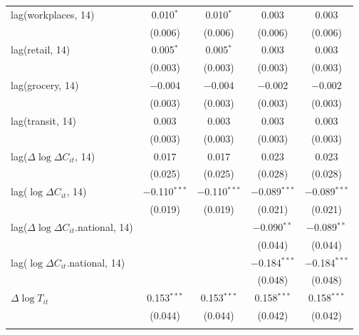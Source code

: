\documentclass{beamer}
\def\bcolor{\color{forestgreen(web)}}
\def\icolor{\color{magenta}}
\begin{document}
\begin{frame}
\begin{table}[!htbp]
\begin{minipage}{\linewidth}
{\begin{tabular}{@{\extracolsep{1pt}}lcccc}
  {\bcolor lag(workplaces, 14) }&{\bcolor  0.010$^{*}$ }& {\bcolor 0.010$^{*}$} &{\bcolor  0.003} & {\bcolor 0.003} \\ 
  & (0.006) & (0.006) & (0.006) & (0.006) \\ 
  {\bcolor lag(retail, 14)} & {\bcolor 0.005$^{*}$} & {\bcolor 0.005$^{*}$} & {\bcolor 0.003} & {\bcolor 0.003} \\ 
  & (0.003) & (0.003) & (0.003) & (0.003) \\ 
  {\bcolor lag(grocery, 14)} & {\bcolor $-$0.004 }& {\bcolor $-$0.004} & {\bcolor $-$0.002 }& {\bcolor $-$0.002 }\\ 
  & (0.003) & (0.003) & (0.003) & (0.003) \\ 
 {\bcolor  lag(transit, 14)} &{\bcolor  0.003} & {\bcolor 0.003} &{\bcolor  0.003 }& {\bcolor 0.003} \\ 
  & (0.003) & (0.003) & (0.003) & (0.003) \\ 
  lag($\Delta \log \Delta C_{it}$, 14) & 0.017 & 0.017 & 0.023 & 0.023 \\ 
  & (0.025) & (0.025) & (0.028) & (0.028) \\ 
{\icolor lag($\log \Delta C_{it}$, 14)} &{\icolor $-$0.110$^{***}$} &{\icolor  $-$0.110$^{***}$ }& {\icolor $-$0.089$^{***}$} &{\icolor  $-$0.089$^{***}$} \\ 
  & (0.019) & (0.019) & (0.021) & (0.021) \\ 
  lag($\Delta \log \Delta C_{it}$.national, 14) &  &  & $-$0.090$^{**}$ & $-$0.089$^{**}$ \\ 
  &  &  & (0.044) & (0.044) \\ 
  lag($\log \Delta C_{it}$.national, 14) &  &  & $-$0.184$^{***}$ & $-$0.184$^{***}$ \\ 
  &  &  & (0.048) & (0.048) \\ 
  $\Delta \log T_{it}$ & 0.153$^{***}$ & 0.153$^{***}$ & 0.158$^{***}$ & 0.158$^{***}$ \\ 
  & (0.044) & (0.044) & (0.042) & (0.042) \\ 
 \hline \\[-1.8ex] 

\end{tabular}}
\end{minipage}
\end{table}
\end{frame}
\end{document}
